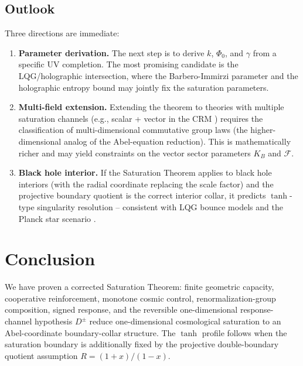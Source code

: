 \documentclass[aps,prd,twocolumn,superscriptaddress,nofootinbib]{revtex4-2}
\begin{document}
\subsection{Outlook}

Three directions are immediate:

\begin{enumerate}
\item \textbf{Parameter derivation.} The next step is to derive $k$, $\Phi_0$, and $\gamma$ from a specific UV completion. The most promising candidate is the LQG/holographic intersection, where the Barbero-Immirzi parameter and the holographic entropy bound may jointly fix the saturation parameters.

\item \textbf{Multi-field extension.} Extending the theorem to theories with multiple saturation channels (e.g., scalar + vector in the CRM \cite{Geiger2026d}) requires the classification of multi-dimensional commutative group laws (the higher-dimensional analog of the Abel-equation reduction). This is mathematically richer and may yield constraints on the vector sector parameters $K_B$ and $\mathcal{F}$.

\item \textbf{Black hole interior.} If the Saturation Theorem applies to black hole interiors (with the radial coordinate replacing the scale factor) and the projective boundary quotient is the correct interior collar, it predicts $\tanh$-type singularity resolution -- consistent with LQG bounce models \cite{Ashtekar2006} and the Planck star scenario \cite{Rovelli2014}.
\end{enumerate}


\section{Conclusion}
\label{sec:conclusion}

We have proven a corrected Saturation Theorem: finite geometric capacity, cooperative reinforcement, monotone cosmic control, renormalization-group composition, signed response, and the reversible one-dimensional response-channel hypothesis $D^\pm$ reduce one-dimensional cosmological saturation to an Abel-coordinate boundary-collar structure. The $\tanh$ profile follows when the saturation boundary is additionally fixed by the projective double-boundary quotient assumption $R=(1+x)/(1-x)$.
\end{document}
